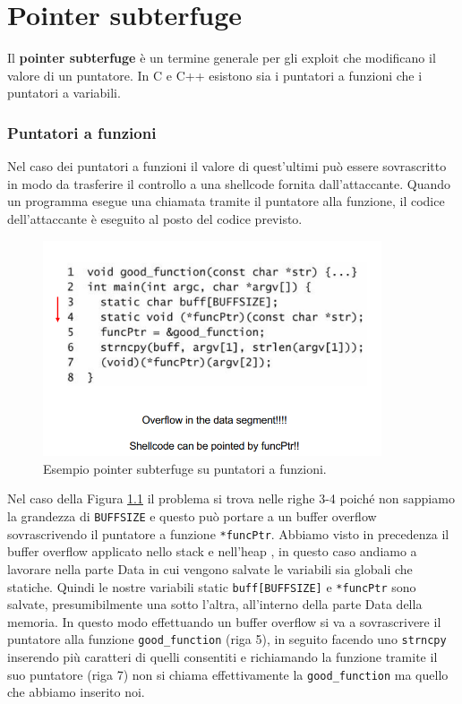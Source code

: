 \chapter{Pointer subterfuge}
Il \textbf{pointer subterfuge} è un termine generale per gli exploit che modificano il valore di un puntatore. In C e C++ esistono sia i puntatori a funzioni che i puntatori a variabili.
\subsection{Puntatori a funzioni}
Nel caso dei puntatori a funzioni il valore di quest'ultimi può essere sovrascritto in modo da trasferire il controllo a una shellcode fornita dall'attaccante. Quando un programma esegue una  chiamata tramite il puntatore alla funzione, il codice dell'attaccante è eseguito al posto del codice previsto.
\begin{figure}[H] 
	\centering
    \includegraphics[width=10cm, keepaspectratio]{santini/img/cap_5/es_pointer_sub.png}
	\caption{Esempio pointer subterfuge su puntatori a funzioni.}\label{fig:es_poin_sub}
\end{figure}
Nel caso della Figura \ref{fig:es_poin_sub} il problema si trova nelle righe 3-4 poiché non sappiamo la grandezza di \verb|BUFFSIZE| e questo può portare a un buffer overflow sovrascrivendo il puntatore a funzione \verb|*funcPtr|. Abbiamo visto in precedenza il buffer overflow applicato nello stack e nell'heap , in questo caso andiamo a lavorare nella parte Data in cui vengono salvate le variabili sia globali che statiche. Quindi le nostre variabili static \verb|buff[BUFFSIZE]| e \verb|*funcPtr| sono salvate, presumibilmente una sotto l'altra, all'interno della parte Data della memoria. In questo modo effettuando un buffer overflow si va a sovrascrivere il puntatore alla funzione \verb|good_function| (riga 5), in seguito facendo uno \verb|strncpy| inserendo più caratteri di quelli consentiti e richiamando la funzione tramite il suo puntatore (riga 7) non si chiama effettivamente la \verb|good_function| ma quello che abbiamo inserito noi. 
